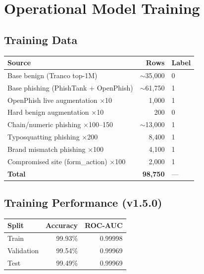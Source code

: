 \documentclass[11pt,a4paper]{article}
\begin{document}
\section{Operational Model Training}

\subsection{Training Data}

\begin{table}[h]
\centering
\begin{tabular}{lrl}
\toprule
Source & Rows & Label \\
\midrule
Base benign (Tranco top-1M) & $\sim$35,000 & 0 \\
Base phishing (PhishTank + OpenPhish) & $\sim$61,750 & 1 \\
OpenPhish live augmentation $\times$10 & 1,000 & 1 \\
Hard benign augmentation $\times$10 & 200 & 0 \\
Chain/numeric phishing $\times$100--150 & $\sim$13,000 & 1 \\
Typosquatting phishing $\times$200 & 8,400 & 1 \\
Brand mismatch phishing $\times$100 & 4,100 & 1 \\
Compromised site (form\_action) $\times$100 & 2,000 & 1 \\
\midrule
\textbf{Total} & \textbf{98,750} & --- \\
\bottomrule
\end{tabular}
\end{table}

\subsection{Training Performance (v1.5.0)}

\begin{table}[h]
\centering
\begin{tabular}{lrr}
\toprule
Split & Accuracy & ROC-AUC \\
\midrule
Train & 99.93\% & 0.99998 \\
Validation & 99.54\% & 0.99969 \\
Test & 99.49\% & 0.99969 \\
\bottomrule
\end{tabular}
\end{table}

\end{document}

